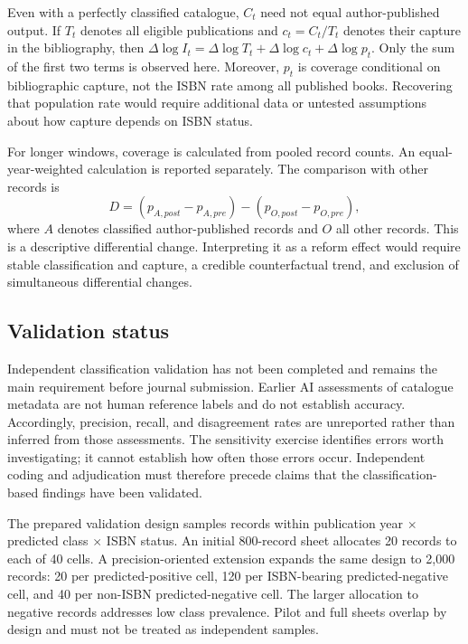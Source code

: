 \documentclass[11pt]{article}
\begin{document}
Even with a perfectly classified catalogue, $C_t$ need not equal author-published output. If $T_t$ denotes all eligible publications and $c_t=C_t/T_t$ denotes their capture in the bibliography, then $\Delta\log I_t=\Delta\log T_t+\Delta\log c_t+\Delta\log p_t$. Only the sum of the first two terms is observed here. Moreover, $p_t$ is coverage conditional on bibliographic capture, not the ISBN rate among all published books. Recovering that population rate would require additional data or untested assumptions about how capture depends on ISBN status.

For longer windows, coverage is calculated from pooled record counts. An equal-year-weighted calculation is reported separately. The comparison with other records is
\begin{equation}\label{eq:comparison}
D=(p_{A,post}-p_{A,pre})-(p_{O,post}-p_{O,pre}),
\end{equation}
where $A$ denotes classified author-published records and $O$ all other records. This is a descriptive differential change. Interpreting it as a reform effect would require stable classification and capture, a credible counterfactual trend, and exclusion of simultaneous differential changes.

\subsection{Validation status}

Independent classification validation has not been completed and remains the main requirement before journal submission. Earlier AI assessments of catalogue metadata are not human reference labels and do not establish accuracy. Accordingly, precision, recall, and disagreement rates are unreported rather than inferred from those assessments. The sensitivity exercise identifies errors worth investigating; it cannot establish how often those errors occur. Independent coding and adjudication must therefore precede claims that the classification-based findings have been validated.

The prepared validation design samples records within publication year $\times$ predicted class $\times$ ISBN status. An initial 800-record sheet allocates 20 records to each of 40 cells. A precision-oriented extension expands the same design to 2,000 records: 20 per predicted-positive cell, 120 per ISBN-bearing predicted-negative cell, and 40 per non-ISBN predicted-negative cell. The larger allocation to negative records addresses low class prevalence. Pilot and full sheets overlap by design and must not be treated as independent samples.
\end{document}
